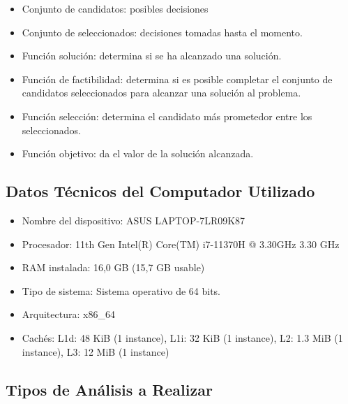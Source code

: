 \documentclass[a4paper,12pt,twoside]{article} %
\begin{document}
\begin{itemize}

	\item Conjunto de candidatos: posibles decisiones
	\item Conjunto de seleccionados: decisiones tomadas hasta el momento.
	\item Función solución: determina si se ha alcanzado una solución.
	\item Función de factibilidad: determina si es posible completar el conjunto de candidatos seleccionados para alcanzar una solución al problema.
	\item Función selección: determina el candidato más prometedor entre los seleccionados.
        \item Función objetivo: da el valor de la solución alcanzada.

\end{itemize}

\newpage


\subsection{Datos Técnicos del Computador Utilizado}

\begin{itemize}

	\item Nombre del dispositivo: ASUS LAPTOP-7LR09K87

	\item Procesador: 11th Gen Intel(R) Core(TM) i7-11370H @ 3.30GHz   3.30 GHz

	\item RAM instalada: 16,0 GB (15,7 GB usable)

	\item Tipo de sistema: Sistema operativo de 64 bits.

	\item Arquitectura: x86\_64

	\item Cachés: L1d: 48 KiB (1 instance), L1i: 32 KiB (1 instance), L2: 1.3 MiB (1 instance), L3: 12 MiB (1 instance)

\end{itemize}
\vspace{1cm}

\subsection{Tipos de Análisis a Realizar}
\end{document}

